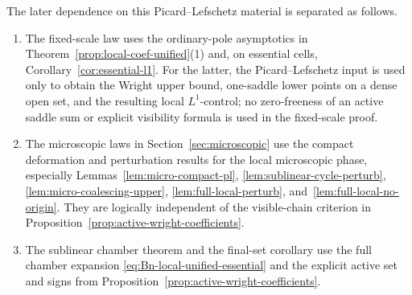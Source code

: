 \documentclass[reqno]{article}
\theoremstyle{definition}
\theoremstyle{remark}
\theoremstyle{plain}
\begin{document}
The later dependence on this Picard--Lefschetz material is separated as follows.
\begin{enumerate}
\item The fixed-scale law uses the ordinary-pole asymptotics in Theorem~\ref{prop:local-coef-unified}\textup{(1)} and, on essential cells, Corollary~\ref{cor:essential-l1}. For the latter, the Picard--Lefschetz input is used only to obtain the Wright upper bound, one-saddle lower points on a dense open set, and the resulting local \(L^1\)-control; no zero-freeness of an active saddle sum or explicit visibility formula is used in the fixed-scale proof.
\item The microscopic laws in Section~\ref{sec:microscopic} use the compact deformation and perturbation results for the local microscopic phase, especially Lemmas~\ref{lem:micro-compact-pl}, \ref{lem:sublinear-cycle-perturb}, \ref{lem:micro-coalescing-upper}, \ref{lem:full-local-perturb}, and~\ref{lem:full-local-no-origin}. They are logically independent of the visible-chain criterion in Proposition~\ref{prop:active-wright-coefficients}.
\item The sublinear chamber theorem and the final-set corollary use the full chamber expansion \eqref{eq:Bn-local-unified-essential} and the explicit active set and signs from Proposition~\ref{prop:active-wright-coefficients}.
\end{enumerate}
\end{document}
